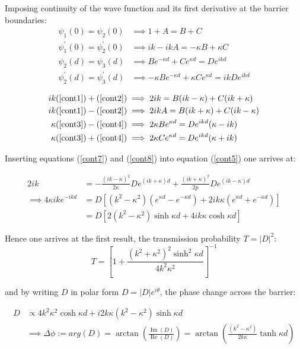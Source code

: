 \documentclass{article}
\begin{document}
\noindent Imposing continuity of the wave function and its first derivative at the barrier boundaries:
\begin{align}
	\psi_{1}(0) = \psi_{2}(0) &\implies 1+A = B+C \label{cont1}\\
	\psi_{1}^{'}(0) = \psi_{2}^{'}(0) &\implies ik - ikA = -\kappa B + \kappa C \label{cont2}\\
	\psi_{2}(d) = \psi_{3}(d) &\implies Be^{-\kappa d} + Ce^{\kappa d} = De^{ikd} \label{cont3}\\
	\psi_{2}^{'}(d) = \psi_{3}^{'}(d) &\implies -\kappa Be^{-\kappa d} + \kappa Ce^{\kappa d} = ikD e^{ikd} \label{cont4}
\end{align}

\begin{align}
	ik(\ref{cont1})+(\ref{cont2}) &\implies 2ik = B(ik-\kappa)+C(ik+\kappa) \label{cont5}\\
	ik(\ref{cont1})-(\ref{cont2}) &\implies 2ikA = B(ik+\kappa)+C(ik-\kappa) \label{cont6}\\
	\kappa(\ref{cont3})-(\ref{cont4}) &\implies 2\kappa Be^{\kappa d} = De^{ikd}(\kappa-ik) \label{cont7}\\
	\kappa(\ref{cont3})+(\ref{cont4}) &\implies 2\kappa Ce^{\kappa d} = De^{ikd}(\kappa+ik) \label{cont8}
\end{align}

\noindent Inserting equations (\ref{cont7}) and (\ref{cont8}) into equation (\ref{cont5}) one arrives at:

\begin{align}
	2ik &= -\frac{(ik-\kappa)^2}{2\kappa}De^{(ik+\kappa)d}+\frac{(ik+\kappa)^2}{2p}De^{(ik-\kappa)d} \label{cont9} \\
	\implies 4\kappa ike^{-ikd} &= D[(k^2-\kappa^2)(e^{\kappa d}-e^{-\kappa d})+2ik\kappa(e^{\kappa d}+e^{-\kappa d})] \label{cont10}\\
				     &= D[2(k^2-\kappa^2)\sinh{\kappa d}+4ik\kappa \cosh{\kappa d}] \label{cont11}
\end{align}

\noindent Hence one arrives at the first result, the transmission probability $T = |D|^2$:
\begin{equation}
	T = [1+\frac{(k^2+\kappa^2)^2\sinh^2{\kappa d}}{4k^2\kappa^2}]^{-1}
	\label{transmissionprobability}
\end{equation}

\noindent and by writing $D$ in polar form $D = |D|e^{i\theta}$, the phase change across the barrier:

\begin{align}
	D &\propto 4k^2\kappa^2 \cosh{\kappa d}+i2k\kappa(k^2-\kappa^2)\sinh{\kappa d} \\
	  &\implies \Delta \phi := arg(D) = \arctan\left(\frac{\operatorname{Im}(D)}{\operatorname{Re}(D)}\right) = \arctan\left(\frac{(k^2-\kappa^2)}{2k\kappa}\tanh{\kappa d}\right) \label{phasechange}
\end{align}
\end{document}
